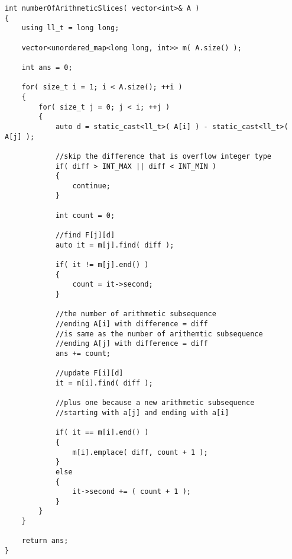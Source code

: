 \setcounter{lstlisting}{0}
\begin{lstlisting}[style=customc, caption={Dynamic Programming}]
int numberOfArithmeticSlices( vector<int>& A )
{
    using ll_t = long long;

    vector<unordered_map<long long, int>> m( A.size() );

    int ans = 0;

    for( size_t i = 1; i < A.size(); ++i )
    {
        for( size_t j = 0; j < i; ++j )
        {
            auto d = static_cast<ll_t>( A[i] ) - static_cast<ll_t>( A[j] );

            //skip the difference that is overflow integer type
            if( diff > INT_MAX || diff < INT_MIN )
            {
                continue;
            }

            int count = 0;

            //find F[j][d]
            auto it = m[j].find( diff );

            if( it != m[j].end() )
            {
                count = it->second;
            }

            //the number of arithmetic subsequence
            //ending A[i] with difference = diff
            //is same as the number of arithemtic subsequence
            //ending A[j] with difference = diff
            ans += count;

            //update F[i][d]
            it = m[i].find( diff );

            //plus one because a new arithmetic subsequence
            //starting with a[j] and ending with a[i]

            if( it == m[i].end() )
            {
                m[i].emplace( diff, count + 1 );
            }
            else
            {
                it->second += ( count + 1 );
            }
        }
    }

    return ans;
}
\end{lstlisting}
